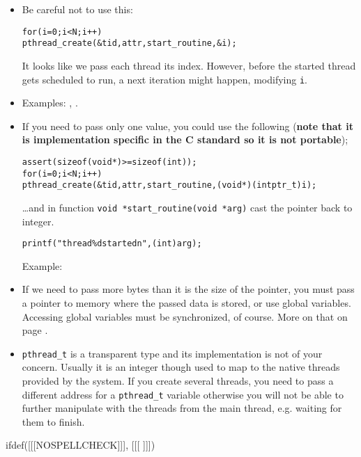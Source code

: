 \begin{itemize}
\item Be careful not to use this:
\begin{alltt}
for (i = 0; i < N; i++)
    pthread\_create(&tid, attr, start\_routine, &i);
\end{alltt}

It looks like we pass each thread its index.  However, before the started thread
gets scheduled to run, a next iteration might happen, modifying \texttt{i}.
\item \label{WRONG_USE_OF_ARG} Examples: ,
.
\item If you need to pass only one value, you could use the following
(\textbf{note that it is implementation specific in the C standard so it is not
portable});

\begin{alltt}
assert(sizeof (void *) >= sizeof (int));
for (i = 0; i < N; i++)
    pthread\_create(&tid, attr, start\_routine, (void *)(intptr\_t)i);
\end{alltt}

\dots and in function \texttt{void *start\_routine(void *arg)} cast the pointer
back to integer.

\begin{alltt}
printf("thread \%d started\bs{}n", (int)arg);
\end{alltt}

\label{INT_AS_ARG} Example: 
\item If we need to pass more bytes than it is the size of the pointer, you must
pass a pointer to memory where the passed data is stored, or use global
variables.  Accessing global variables must be synchronized, of course.  More on
that on page \pageref{THREADSYNCHRONIZATION}.
\item \label{PTHREAD_CREATE_CYCLE} \texttt{pthread\_t} is a transparent type and
its implementation is not of your concern.  Usually it is an integer though used
to map to the native threads provided by the system.  If you create several
threads, you need to pass a different address for a \texttt{pthread\_t} variable
otherwise you will not be able to further manipulate with the threads from the
main thread, e.g. waiting for them to finish.
\end{itemize}


ifdef([[[NOSPELLCHECK]]], [[[
\label{THREAD_ATTRS}
]]])

